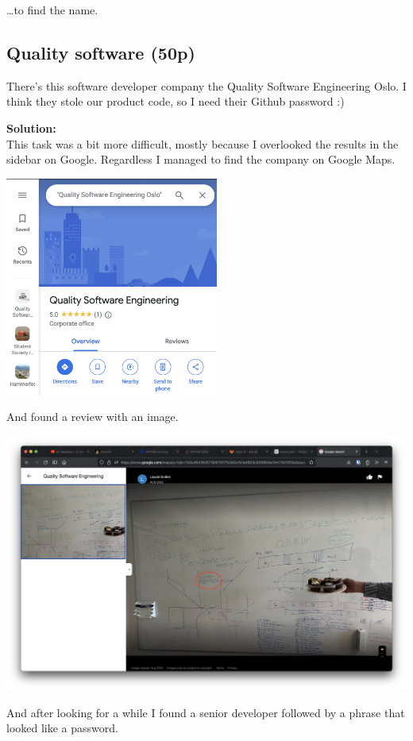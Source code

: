 \dots to find the name.

\subsection{Quality software (50p)}
There's this software developer company the Quality Software Engineering Oslo. I think they stole our product code, so I need their Github password :)

\textbf{Solution:}\\
This task was a bit more difficult, mostly because I overlooked the results in the sidebar on Google. Regardless I managed to find the company on Google Maps.

\includegraphics[width=7cm]{img/OSINT/Quality software/Skjermbilde 2023-09-11 kl. 17.30.32.png}

And found a review with an image.

\includegraphics[width=16cm]{img/OSINT/Quality software/Skjermbilde 2023-09-06 kl. 11.54.53.png}

And after looking for a while I found a senior developer followed by a phrase that looked like a password.

